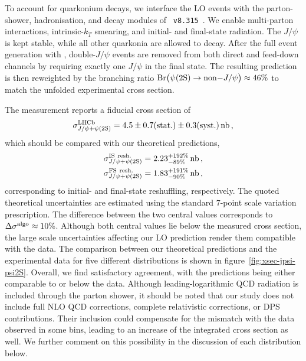 To account for quarkonium decays, we interface the {\mgshort} LO events with the parton-shower, hadronisation, and decay modules of \pythia~{\tt v8.315}~\cite{Bierlich:2022pfr}. We enable multi-parton interactions, intrinsic-$k_T$ smearing, and initial- and final-state radiation. The $J/\psi$ is kept stable, while all other quarkonia are allowed to decay. After the full event generation with , double-$J/\psi$ events are removed from both direct and feed-down channels by requiring exactly one $J/\psi$ in the final state. The resulting prediction is then reweighted by the branching ratio ${\rm Br}\big(\psi(2\mathrm{S})\to {\rm non-}J/\psi\big)\approx 46\%$ to match the unfolded experimental cross section.

The measurement reports a fiducial cross section of
\begin{equation}
\sigma^{\rm LHCb}_{J/\psi+\psi(2\mathrm{S})} = 4.5\pm{0.7}({\rm stat.})\pm{0.3} ({\rm syst.})\,{\rm nb}\,,
\end{equation}
which should be compared with our theoretical predictions,
\begin{align}
    \sigma^{\rm IS~resh.}_{J/\psi+\psi(2\mathrm{S})} & = 2.23^{+192\%}_{-89\%}\,{\rm nb}\,,\\ 
    \sigma^{\rm FS~resh.}_{J/\psi+\psi(2\mathrm{S})} & = 1.83^{+191\%}_{-90\%}\,{\rm nb}\,,
\end{align}
corresponding to initial- and final-state reshuffling, respectively. The quoted theoretical uncertainties are estimated using the standard $7$-point scale variation prescription. The difference between the two central values corresponds to $\Delta \sigma^{\rm algo} \approx 10\%$. Although both central values lie below the measured cross section, the large scale uncertainties affecting our LO prediction render them compatible with the data.
The comparison between our theoretical predictions and the experimental data for five different distributions is shown in figure~\ref{fig:xsec-jpsi-psi2S}. 
Overall, we find satisfactory agreement, with the predictions being either comparable to or below the data. 
Although leading-logarithmic QCD radiation is included through the parton shower, it should be noted that our study does not include full NLO QCD corrections, complete relativistic corrections, or DPS contributions.
Their inclusion could compensate for the mismatch with the data observed in some bins, leading to an increase of the integrated cross section as well. We further comment on this possibility in the discussion of each distribution below.

